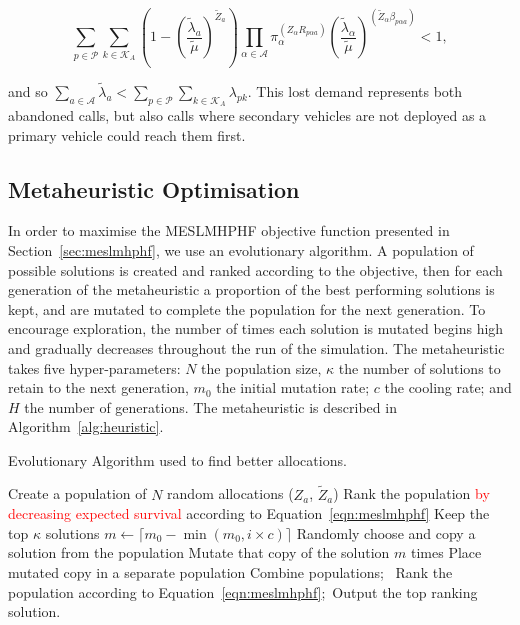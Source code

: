 \documentclass[numbers,webpdf,imaman]{ima-authoring-template}%
\begin{document}
$$\sum_{p \in \mathcal{P}} \sum_{k \in \mathcal{K}_A} \left( 1 - \left(\frac{\tilde{\lambda}_a}{\tilde{\mu}}\right)^{\tilde{Z}_a} \right) \prod_{\alpha \in \mathcal{A}} \pi_{\alpha}^{\left(Z_{\alpha} R_{p \alpha a}\right)} \left(\frac{\tilde{\lambda}_{\alpha}}{\tilde{\mu}}\right)^{ \left(\tilde{Z}_{\alpha} \beta_{p \alpha a}\right)} < 1,$$

\noindent
and so
$\sum_{a \in \mathcal{A}} \tilde{\lambda}_a < \sum_{p \in \mathcal{P}} \sum_{k \in \mathcal{K}_A} \lambda_{pk}$.
This lost demand represents both abandoned calls, but also calls where secondary
vehicles are not deployed as a primary vehicle could reach them first.



\subsection{Metaheuristic Optimisation}\label{sec:heuristic}
In order to maximise the MESLMHPHF objective function presented in
Section~\ref{sec:meslmhphf}, we use an evolutionary algorithm. A population of
possible solutions is created and ranked according to the objective, then for
each generation of the metaheuristic a proportion of the best performing
solutions is kept, and are mutated to complete the population for the next
generation. To encourage exploration, the number of times each solution is
mutated begins high and gradually decreases throughout the run of the
simulation. The metaheuristic takes five hyper-parameters: $N$ the population
size, $\kappa$ the number of solutions to retain to the next generation, $m_0$
the initial mutation rate; $c$ the cooling rate; and $H$ the number of
generations. The metaheuristic is described in Algorithm~\ref{alg:heuristic}.

\begin{algorithm}
\algnewcommand{}
\caption{Evolutionary Algorithm used to find better allocations.}
\label{alg:heuristic}
\begin{algorithmic}[1]
\State Create a population of $N$ random allocations ($Z_a$, $\tilde{Z}_a$)\;
  \State Rank the population \textcolor{red}{by decreasing expected survival} according to Equation~\ref{eqn:meslmhphf}\;
  \State Keep the top $\kappa$ solutions\;
  \State $m \leftarrow \lceil m_0 - \min\left(m_0, i \times c\right)\rceil$\;
    \State Randomly choose and copy a solution from the population\;
    \State Mutate that copy of the solution $m$ times\;
    \State Place mutated copy in a separate population\;
  \EndFor
  \State Combine populations;\
\EndFor
\State Rank the population according to Equation~\ref{eqn:meslmhphf};\
\State Output the top ranking solution.
\end{algorithmic}
\end{algorithm}
\end{document}

